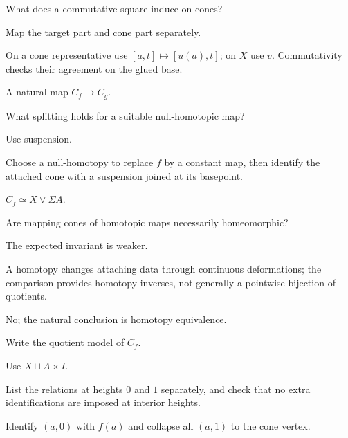 \begin{exercise}\label{exr:viii07-19}
What does a commutative square induce on cones?
\end{exercise}
\begin{hint}
Map the target part and cone part separately.

On a cone representative use \([a,t]\mapsto[u(a),t]\); on \(X\) use \(v\). Commutativity checks their agreement on the glued base.
\end{hint}
\begin{solution}
A natural map \(C_f\to C_g\).
\end{solution}

\begin{exercise}\label{exr:viii07-20}
What splitting holds for a suitable null-homotopic map?
\end{exercise}
\begin{hint}
Use suspension.

Choose a null-homotopy to replace \(f\) by a constant map, then identify the attached cone with a suspension joined at its basepoint.
\end{hint}
\begin{solution}
\(C_f\simeq X\vee\Sigma A\).
\end{solution}

\begin{exercise}\label{exr:viii07-21}
Are mapping cones of homotopic maps necessarily homeomorphic?
\end{exercise}
\begin{hint}
The expected invariant is weaker.

A homotopy changes attaching data through continuous deformations; the comparison provides homotopy inverses, not generally a pointwise bijection of quotients.
\end{hint}
\begin{solution}
No; the natural conclusion is homotopy equivalence.
\end{solution}

\begin{exercise}\label{exr:viii07-22}
Write the quotient model of \(C_f\).
\end{exercise}
\begin{hint}
Use \(X\sqcup A\times I\).

List the relations at heights \(0\) and \(1\) separately, and check that no extra identifications are imposed at interior heights.
\end{hint}
\begin{solution}
Identify \((a,0)\) with \(f(a)\) and collapse all \((a,1)\) to the cone vertex.
\end{solution}

